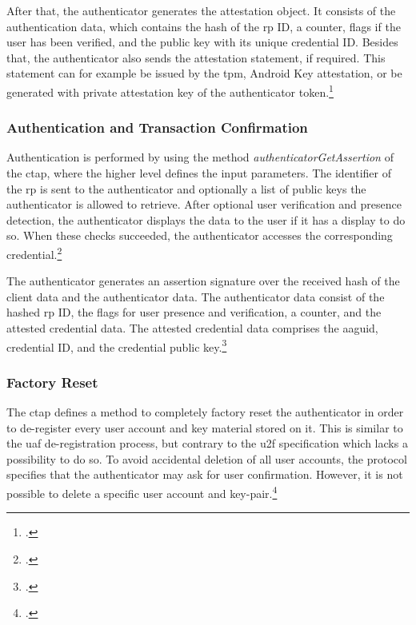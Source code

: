 After that, the authenticator generates the attestation object. It consists of the authentication data, which contains the hash of the \gls{rp} ID, a counter, flags if the user has been verified, and the public key with its unique credential ID. Besides that, the authenticator also sends the attestation statement, if required. This statement can for example be issued by the \gls{tpm}, Android Key attestation, or be generated with private attestation key of the authenticator token.\footcites[See][9]{ctap2}[See][Chapter 8]{w3c}

\subsubsection{Authentication and Transaction Confirmation}

Authentication is performed by using the method \textit{authenticatorGetAssertion} of the \gls{ctap}, where the higher level \wa{} defines the input parameters. The identifier of the \gls{rp} is sent to the authenticator and optionally a list of public keys the authenticator is allowed to retrieve. After optional user verification and presence detection, the authenticator displays the data to the user if it has a display to do so. When these checks succeeded, the authenticator accesses the corresponding credential.\footcites[See][11-13]{ctap2}

The authenticator generates an assertion signature over the received hash of the client data and the authenticator data. The authenticator data consist of the hashed \gls{rp} ID, the flags for user presence and verification, a counter, and the attested credential data. The attested credential data comprises the \gls{aaguid}, credential ID, and the credential public key.\footcites[See][Chapter 6.4.1.]{w3c}

\subsubsection{Factory Reset}

The \gls{ctap} defines a method to completely factory reset the authenticator in order to de-register every user account and key material stored on it. This is similar to the \gls{uaf} de-registration process, but contrary to the \gls{u2f} specification which lacks a possibility to do so. To avoid accidental deletion of all user accounts, the protocol specifies that the authenticator may ask for user confirmation. However, it is not possible to delete a specific user account and key-pair.\footcites[See][26]{ctap2}

